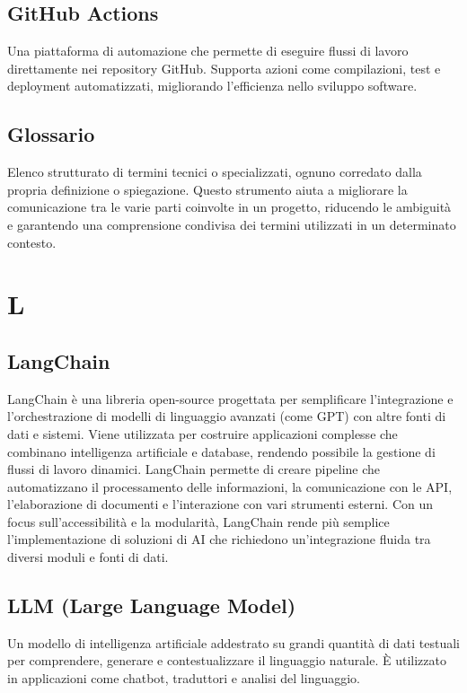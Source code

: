 \documentclass{article}
\begin{document}
\subsection{GitHub Actions}
Una piattaforma di automazione che permette di eseguire flussi di lavoro direttamente nei repository GitHub. Supporta azioni come compilazioni, test e deployment automatizzati, migliorando l'efficienza nello sviluppo software.

\subsection{Glossario}
Elenco strutturato di termini tecnici o specializzati, ognuno corredato dalla propria definizione o spiegazione. Questo strumento aiuta a migliorare la comunicazione tra le varie parti coinvolte in un progetto, riducendo le ambiguità e garantendo una comprensione condivisa dei termini utilizzati in un determinato contesto.

\newpage

\section{L}
\subsection{LangChain}
LangChain è una libreria open-source progettata per semplificare l'integrazione e l'orchestrazione di modelli di linguaggio avanzati (come GPT) con altre fonti di dati e sistemi. Viene utilizzata per costruire applicazioni complesse che combinano intelligenza artificiale e database, rendendo possibile la gestione di flussi di lavoro dinamici. LangChain permette di creare pipeline che automatizzano il processamento delle informazioni, la comunicazione con le API, l'elaborazione di documenti e l'interazione con vari strumenti esterni. Con un focus sull'accessibilità e la modularità, LangChain rende più semplice l'implementazione di soluzioni di AI che richiedono un'integrazione fluida tra diversi moduli e fonti di dati.

\subsection{LLM (Large Language Model)}
Un modello di intelligenza artificiale addestrato su grandi quantità di dati testuali per comprendere, generare e contestualizzare il linguaggio naturale. È utilizzato in applicazioni come chatbot, traduttori e analisi del linguaggio.
\end{document}
